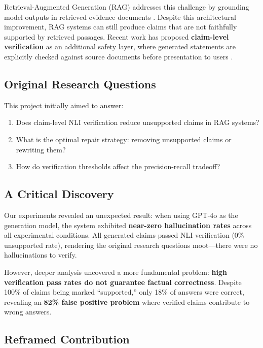 \documentclass[11pt]{article}
\begin{document}
Retrieval-Augmented Generation (RAG) addresses this challenge by grounding model outputs in retrieved evidence documents \cite{lewis2020retrieval}. Despite this architectural improvement, RAG systems can still produce claims that are not faithfully supported by retrieved passages. Recent work has proposed \textbf{claim-level verification} as an additional safety layer, where generated statements are explicitly checked against source documents before presentation to users \cite{gao2023rarr, bohnet2022attributed}.

\subsection{Original Research Questions}

This project initially aimed to answer:

\begin{enumerate}
\item Does claim-level NLI verification reduce unsupported claims in RAG systems?
\item What is the optimal repair strategy: removing unsupported claims or rewriting them?
\item How do verification thresholds affect the precision-recall tradeoff?
\end{enumerate}

\subsection{A Critical Discovery}

Our experiments revealed an unexpected result: when using GPT-4o \cite{openai2024gpt4o} as the generation model, the system exhibited \textbf{near-zero hallucination rates} across all experimental conditions. All generated claims passed NLI verification (0\% unsupported rate), rendering the original research questions moot—there were no hallucinations to verify.

However, deeper analysis uncovered a more fundamental problem: \textbf{high verification pass rates do not guarantee factual correctness}. Despite 100\% of claims being marked ``supported,'' only 18\% of answers were correct, revealing an \textbf{82\% false positive problem} where verified claims contribute to wrong answers.

\subsection{Reframed Contribution}
\end{document}
